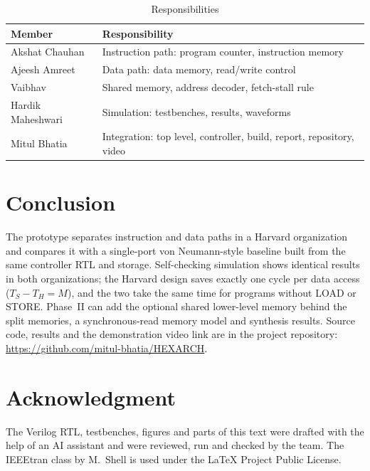 \documentclass[conference,a4paper]{IEEEtran}
\begin{document}
\begin{table}[t]
\caption{Responsibilities}
\label{tab:contrib}
\centering
\begin{tabular}{p{}p{}}
\hline
Member & Responsibility \\ \hline
Akshat Chauhan & Instruction path: program counter, instruction memory \\
Ajeesh Amreet & Data path: data memory, read/write control \\
Vaibhav & Shared memory, address decoder, fetch-stall rule \\
Hardik Maheshwari & Simulation: testbenches, results, waveforms \\
Mitul Bhatia & Integration: top level, controller, build, report, repository, video \\ \hline
\end{tabular}
\end{table}

\section{Conclusion}
The prototype separates instruction and data paths in a Harvard
organization and compares it with a single-port von Neumann-style
baseline built from the same controller RTL and storage. Self-checking
simulation shows identical results in both organizations; the Harvard
design saves exactly one cycle per data access ($T_S-T_H=M$), and the
two take the same time for programs without LOAD or STORE. Phase~II can
add the optional shared lower-level memory behind the split memories, a
synchronous-read memory model and synthesis results. Source code,
results and the demonstration video link are in the project repository:
\url{https://github.com/mitul-bhatia/HEXARCH}.

\section*{Acknowledgment}
The Verilog RTL, testbenches, figures and parts of this text were drafted
with the help of an AI assistant and were reviewed, run and checked by
the team. The IEEEtran class by M.~Shell is used under the LaTeX Project
Public License.
\end{document}
